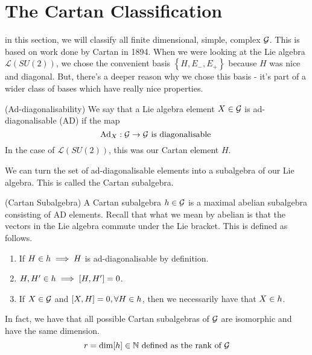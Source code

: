 \section{The Cartan Classification}
in this section, we will classify all finite dimensional, 
simple, complex $\mathcal{ G }$. This is based on work done by Cartan in 1894. 
When we were looking at the Lie algebra $\mathcal{ L } ( SU ( 2) ) $, 
we chose the convenient basis $ \left\{  H, E_- , E_+ \right\} $ because 
$ H $  was nice and diagonal. But, there's a deeper reason 
why we chose this basis - it's part of a wider class of 
bases which have really nice properties. 
\begin{defn}{(Ad-diagonalisability)}
	We say that a Lie algebra element $ X \in \mathcal{ G } $ is 
	ad-diagonalisable (AD) if the map 
	\[
	 \text{Ad}_ X : \mathcal{ G } \to \mathcal{ G } \text{ is diagonalisable }
 \] In the case of $ \mathcal{ L } ( SU ( 2) ) $, this was 
 our Cartan element $ H $. 
\end{defn}
 
We can turn the set of ad-diagonalisable elements into 
a subalgebra of our Lie algebra. This is called the Cartan subalgebra. 

\begin{defn}{(Cartan Subalgebra)}
A Cartan subalgebra $ h \in \mathcal{ G } $ is a maximal abelian subalgebra 
consisting of AD elements. Recall that what we mean 
by abelian is that the vectors in the Lie algebra commute 
under the Lie bracket. 
This is defined as follows. 
\begin{enumerate}
	\item If $ H \in h \implies H  $ is ad-diagonalisable by definition.  
	\item $ H , H ' \in h \implies [ H , H ' ] = 0$. 
	\item If  $ X \in \mathcal{ G } $ and $ [ X, H ] = 0 , \forall H \in h$, 
		then we necessarily have that  $ X \in h$. 
\end{enumerate}
In fact, we have that all possible Cartan subalgebras of $ \mathcal{ G } $ are 
isomorphic and have the same dimension. 
\[
 r = \dim [ h ] \in \mathbb{ N} \text{ defined as the rank of } \mathcal{ G } 
\] 	
\end{defn}

